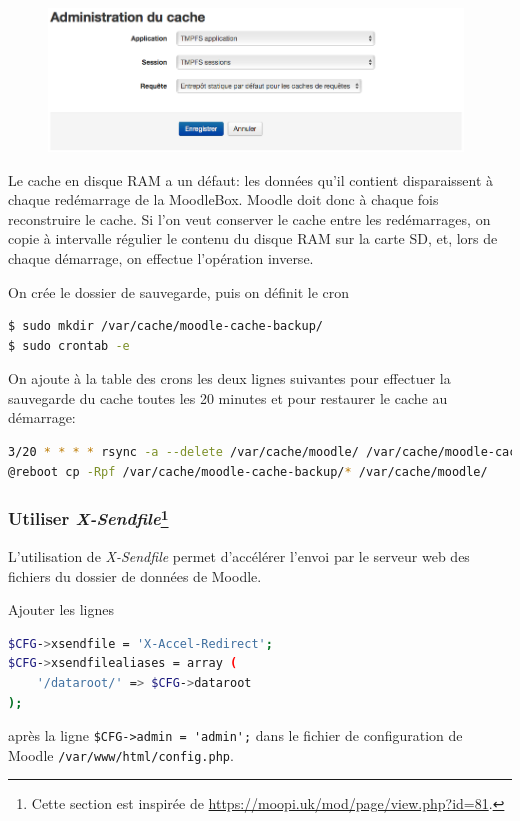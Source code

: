 \documentclass[11pt]{article}
\begin{document}
\begin{figure}[!ht]
\begin{minipage}[b]{\linewidth}
\centering
\includegraphics[width=11cm]{cache-association.png}
\end{minipage}
\end{figure}

Le cache en disque RAM a un défaut: les données qu'il contient disparaissent à chaque redémarrage de la MoodleBox. Moodle doit donc à chaque fois reconstruire le cache. Si l'on veut conserver le cache entre les redémarrages, on copie à intervalle régulier le contenu du disque RAM sur la carte SD, et, lors de chaque démarrage, on effectue l'opération inverse.

On crée le dossier de sauvegarde, puis on définit le cron
\begin{lstlisting}[language=bash]
$ sudo mkdir /var/cache/moodle-cache-backup/
$ sudo crontab -e
\end{lstlisting}

On ajoute à la table des crons les deux lignes suivantes pour effectuer la sauvegarde du cache toutes les 20 minutes et pour restaurer le cache au démarrage:
\begin{lstlisting}[language=bash]
3/20 * * * * rsync -a --delete /var/cache/moodle/ /var/cache/moodle-cache-backup/
@reboot cp -Rpf /var/cache/moodle-cache-backup/* /var/cache/moodle/
\end{lstlisting}

\subsubsection[Utiliser \emph{X-Sendfile}]{Utiliser \emph{X-Sendfile}\footnote{Cette section est inspirée de \url{https://moopi.uk/mod/page/view.php?id=81}.}}

L'utilisation de \emph{X-Sendfile} permet d'accélérer l'envoi par le serveur web des fichiers du dossier de données de Moodle.

Ajouter les lignes
\begin{lstlisting}[language=bash]
$CFG->xsendfile = 'X-Accel-Redirect';
$CFG->xsendfilealiases = array (
    '/dataroot/' => $CFG->dataroot
);
\end{lstlisting}
après la ligne \lstinline{$CFG->admin = 'admin';} dans le fichier de configuration de Moodle \lstinline{/var/www/html/config.php}.
\end{document}

